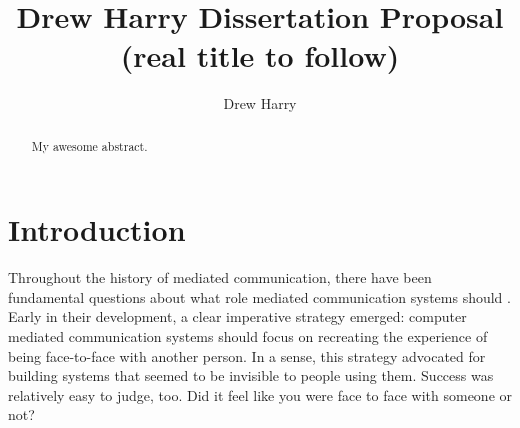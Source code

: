\documentclass{tufte-handout}
\title{Drew Harry Dissertation Proposal (real title to follow)}
\author[Drew Harry]{Drew Harry}
\begin{document}
\maketitle%

\begin{abstract}
\noindent My awesome abstract.
\end{abstract}



\section{Introduction}\label{sec:introduction}





Throughout the history of mediated communication, there have been fundamental questions about what role mediated communication systems should . Early in their development, a clear imperative strategy emerged: computer mediated communication systems should focus on recreating the experience of being face-to-face with another person. In a sense, this strategy advocated for building systems that seemed to be invisible to people using them. \cite{weiser} Success was relatively easy to judge, too. Did it feel like you were face to face with someone or not?
\end{document}
